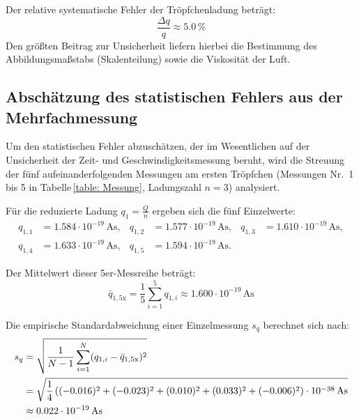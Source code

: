 \documentclass[12pt,a4paper,titlepage]{scrartcl}
\numberwithin{equation}{section}
\numberwithin{table}{section}
\numberwithin{figure}{section}
\begin{document}
\begin{resultbox}
    Der relative systematische Fehler der Tröpfchenladung beträgt:
    \begin{equation*}
        \frac{\Delta q}{q} \approx 5.0\,\%
    \end{equation*}
    Den größten Beitrag zur Unsicherheit liefern hierbei die Bestimmung des Abbildungsmaßstabs (Skalenteilung) sowie die Viskosität der Luft.
\end{resultbox}

\subsection{Abschätzung des statistischen Fehlers aus der Mehrfachmessung}

Um den statistischen Fehler abzuschätzen, der im Wesentlichen auf der Unsicherheit der Zeit- und Geschwindigkeitsmessung beruht,
wird die Streuung der fünf aufeinanderfolgenden Messungen am ersten Tröpfchen (Messungen Nr.~1 bis 5 in Tabelle\,\ref{table: Messung}, Ladungszahl $n=3$) analysiert.

\medskip
\noindent
Für die reduzierte Ladung $q_1 = \frac{Q}{n}$ ergeben sich die fünf Einzelwerte:
\begin{align*}
    q_{1,1} &= 1.584 \cdot 10^{-19}\,\text{As}, & 
    q_{1,2} &= 1.577 \cdot 10^{-19}\,\text{As}, & 
    q_{1,3} &= 1.610 \cdot 10^{-19}\,\text{As}, \\
    q_{1,4} &= 1.633 \cdot 10^{-19}\,\text{As}, & 
    q_{1,5} &= 1.594 \cdot 10^{-19}\,\text{As}.
\end{align*}

\noindent
Der Mittelwert dieser 5er-Messreihe beträgt:
\begin{equation}
    \bar{q}_{1,\text{5x}} = \frac{1}{5}\sum_{i=1}^{5} q_{1,i} \approx 1.600 \cdot 10^{-19}\,\text{As}
\end{equation}

\noindent
Die empirische Standardabweichung einer Einzelmessung $s_q$ berechnet sich nach:
\begin{align}
    s_q &= \sqrt{\frac{1}{N-1}\sum_{i=1}^{N}(q_{1,i} - \bar{q}_{1,\text{5x}})^2} \notag \\
        &= \sqrt{\frac{1}{4} \left( (-0.016)^2 + (-0.023)^2 + (0.010)^2 + (0.033)^2 + (-0.006)^2 \right) \cdot 10^{-38}\,\text{As}} \notag \\
        &\approx 0.022 \cdot 10^{-19}\,\text{As}
\end{align}
\end{document}
